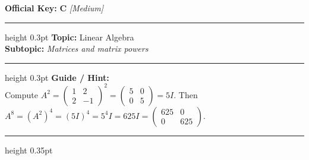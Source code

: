 \documentclass[a4paper,10pt]{article}
\begin{document}
\begin{tcolorbox}
\tcblower

\textbf{Official Key:} \textbf{\large C} \hfill \textit{\small [Medium]}
\vspace{2pt}\hrule height 0.3pt\vspace{3pt}
\textbf{Topic:} Linear Algebra \\
\textbf{Subtopic:} \textit{Matrices and matrix powers}
\vspace{2pt}\hrule height 0.3pt\vspace{3pt}
\textbf{Guide / Hint:} \\
{\small Compute $A^2 = \begin{pmatrix} 1 & 2 \\ 2 & -1 \end{pmatrix}^2 = \begin{pmatrix} 5 & 0 \\ 0 & 5 \end{pmatrix} = 5I$. Then $A^8 = (A^2)^4 = (5I)^4 = 5^4 I = 625I = \begin{pmatrix} 625 & 0 \\ 0 & 625 \end{pmatrix}$.}

\end{tcolorbox}
\vspace{6pt}\hrule height 0.35pt\vspace{6pt}
\noindent
\end{document}
